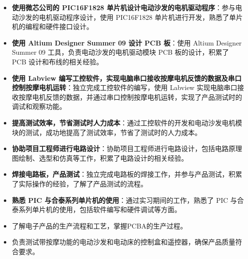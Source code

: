 \documentclass{resume}
\begin{document}
\begin{itemize}

\item \textbf{使用微芯公司的 PIC16F1828 单片机设计电动沙发的电机驱动程序}：参与电动沙发的电机驱动程序设计，使用 PIC16F1828 单片机进行开发，熟悉了单片机的编程和硬件接口设计。

\item \textbf{使用 Altium Designer Summer 09 设计 PCB 板}：使用 Altium Designer Summer 09 工具，负责电动沙发的电机驱动模块 PCB 板的设计，积累了 PCB 设计和布线的相关经验。

\item \textbf{使用 Labview 编写工控软件，实现电脑串口接收按摩电机反馈的数据及串口控制按摩电机运转}：独立完成工控软件的编写，使用 Labview 实现电脑串口接收按摩电机反馈的数据，并通过串口控制按摩电机运转，实现了产品测试时的调试和观察功能。

\item \textbf{提高测试效率，节省测试时人力成本}：通过工控软件的开发和电动沙发电机模块的测试，成功地提高了测试效率，节省了测试时的人力成本。

\end{itemize}

\begin{itemize}

\item \textbf{协助项目工程师进行电路设计}：协助项目工程师进行电路设计，包括电路原理图绘制、选型和仿真等工作，积累了电路设计的相关经验。

\item \textbf{焊接电路板，产品测试}：独立完成电路板的焊接工作，并参与产品测试，积累了实际操作的经验，了解了产品测试的流程。

\item \textbf{熟悉 PIC 与合泰系列单片机的使用}：通过实习期间的工作，熟悉了 PIC 与合泰系列单片机的使用，包括软件编写和硬件调试等方面。

\end{itemize}

\begin{itemize}
\item 了解电子产品的生产流程和工艺，掌握PCBA的生产过程。
\item 负责测试带按摩功能的电动沙发和电动床的控制盒和遥控器，确保产品质量符合要求。
\end{itemize}
\end{document}
